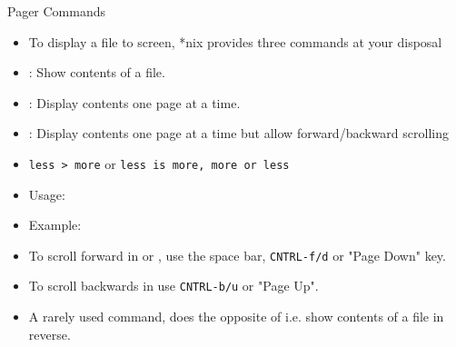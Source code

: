\documentclass[10pt,t]{beamer}
\begin{document}
\begin{frame}[fragile]{Pager Commands}
  \begin{itemize}
    \item To display a file to screen, *nix provides three commands at your disposal
    \item {}: Show contents of a file.
    \item {}: Display contents one page at a time.
    \item {}: Display contents one page at a time but allow forward/backward scrolling
    \item[] \texttt{less > more} or \texttt{less is more, more or less}
    \item Usage: 
    \item Example: 
    \item To scroll forward in  or , use the space bar, \texttt{CNTRL-f/d} or "Page Down" key.
    \item To scroll backwards in  use \texttt{CNTRL-b/u} or "Page Up".
    \item A rarely used command,  does the opposite of  i.e. show contents of a file in reverse.
  \end{itemize}
\end{frame}
\end{document}

